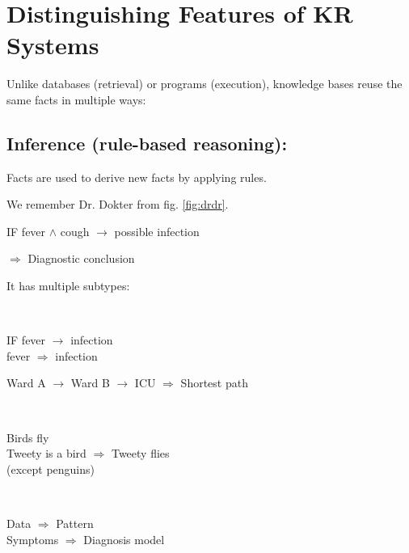 \section{Distinguishing Features of KR Systems}\label{sec:distinguishing-features-of-kr-systems}
Unlike databases (retrieval) or programs (execution), knowledge bases reuse the same facts in multiple ways:

\subsection*{Inference (rule-based reasoning):}
Facts are used to derive new facts by applying rules.
\begin{bsp}
    We remember Dr. Dokter from fig. \ref{fig:drdr}.
    \begin{center}
        IF fever $\land$ cough $\rightarrow$ possible infection
    \end{center}
    $\Rightarrow$ Diagnostic conclusion
\end{bsp}

It has multiple subtypes:
\begin{bsp}
    $\ $
    \begin{center}
        IF fever $\rightarrow$ infection \\
        fever $\Rightarrow$ infection
    \end{center}
\end{bsp}


\begin{bsp}
    Ward A $\rightarrow$ Ward B $\rightarrow$ ICU $\Rightarrow$ Shortest path
\end{bsp}


\begin{bsp}
    $\ $
    \begin{center}
        Birds fly \\
        Tweety is a bird $\Rightarrow$ Tweety flies \\ (except penguins)
    \end{center}
\end{bsp}


\begin{bsp}
    $\ $
    \begin{center}
        Data $\Rightarrow$ Pattern \\
        Symptoms $\Rightarrow$ Diagnosis model
    \end{center}
\end{bsp}

